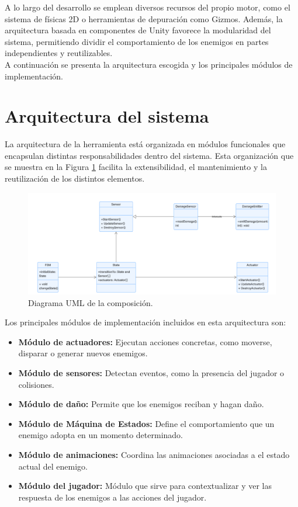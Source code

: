 A lo largo del desarrollo se emplean diversos recursos del propio motor, como el sistema de físicas 2D o herramientas de depuración como Gizmos. Además, la arquitectura basada en componentes de Unity favorece la modularidad del sistema, permitiendo dividir el comportamiento de los enemigos en partes independientes y reutilizables.\\

A continuación se presenta la arquitectura escogida y los principales módulos de implementación.

\section{Arquitectura del sistema}
La arquitectura de la herramienta está organizada en módulos funcionales que encapsulan distintas responsabilidades dentro del sistema. Esta organización que se muestra en la Figura \ref{fig:GeneralUML} facilita la extensibilidad, el mantenimiento y la reutilización de los distintos elementos.\\

\begin{figure}[t]
	\centering
	\includegraphics[width = 1\textwidth]{Imagenes/UMLGeneral.png}
	\caption{Diagrama UML de la composición.}
	\label{fig:GeneralUML}
\end{figure}
Los principales módulos de implementación incluidos en esta arquitectura son:
\begin{itemize}
\item \textbf{Módulo de actuadores:} Ejecutan acciones concretas, como moverse, disparar o generar nuevos enemigos. 
\item \textbf{Módulo de sensores:} Detectan eventos, como la presencia del jugador o colisiones.
\item \textbf{Módulo de daño:} Permite que los enemigos reciban y hagan daño.
\item \textbf{Módulo de Máquina de Estados:} Define el comportamiento que un enemigo adopta en un momento determinado.
\item \textbf{Módulo de animaciones:} Coordina las animaciones asociadas a el estado actual del enemigo.
\item \textbf{Módulo del jugador:} Módulo que sirve para contextualizar y ver las respuesta de los enemigos a las acciones del jugador.
\end{itemize}

